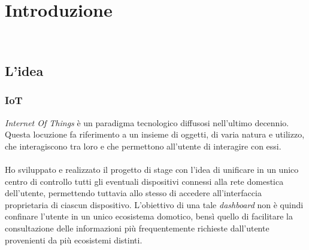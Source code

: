
\chapter{Introduzione}
\label{cap:introduzione}

\\

%
%

\section{L'idea}

\subsection{IoT}
\label{intro-iot}

\emph{Internet Of Things} è un paradigma tecnologico diffusosi nell'ultimo decennio. Questa locuzione fa riferimento a un insieme di oggetti,
di varia natura e utilizzo, che interagiscono tra loro e che permettono all'utente di interagire con essi. \\ \\
Ho sviluppato e realizzato il progetto di stage con l'idea di unificare in un unico centro di controllo tutti gli eventuali dispositivi connessi alla rete domestica dell'utente, permettendo tuttavia allo stesso di accedere all'interfaccia proprietaria di ciascun dispositivo.
L'obiettivo di una tale \emph{dashboard} non è quindi confinare l'utente in un unico ecosistema domotico,
bensì quello di facilitare la consultazione delle informazioni più frequentemente richieste dall'utente provenienti da più ecosistemi distinti. \\

